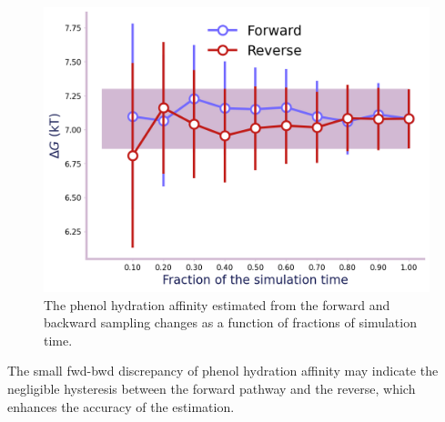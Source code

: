 \documentclass[9pt,tutorial]{livecoms}
\begin{document}
\begin{figure}[h!t]
\centering
\includegraphics[width=0.9\linewidth]{Supp-Files/AFEP-Hydration/output/Alchemlyb/output_5_0.png}
\caption{The phenol hydration affinity estimated from the forward and backward sampling changes as a function of fractions of simulation time.}
\label{fig:AFEP-Hyd-1}
\end{figure}

The small fwd-bwd discrepancy of phenol hydration affinity may indicate the negligible hysteresis between the forward pathway and the reverse, which enhances the accuracy of the estimation.
\end{document}
